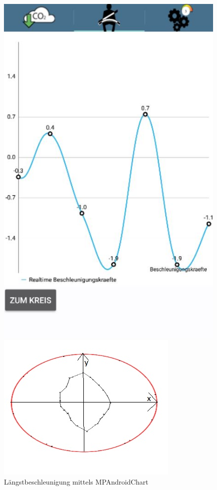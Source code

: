 \begin{figure}[!tbp]
 	\centering
 	\begin{minipage}[b]{0.4\textwidth}
 		\includegraphics[width=\textwidth]{images/Liniendiagramm}
 		\caption{Längstbeschleunigung mittels MPAndroidChart}
 	\end{minipage}
 	\hfill
 	\begin{minipage}[b]{0.4\textwidth}
 		\includegraphics[width=\textwidth]{images/Kammscherkreis-u}

\end{minipage}
\end{figure}
